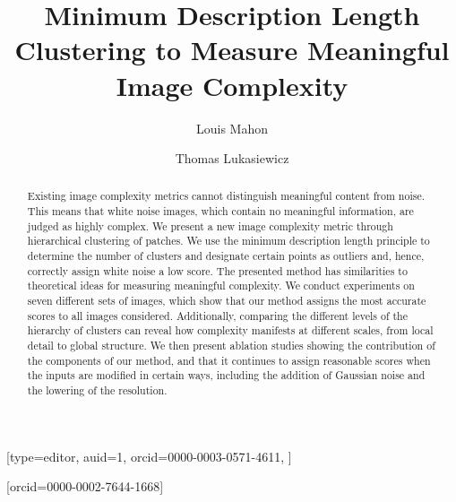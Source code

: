 \documentclass[a4paper,fleqn]{cas-sc}
\title{Minimum Description Length Clustering to Measure Meaningful Image Complexity}
\theoremstyle{remark}
\begin{document}


%
\author[1,3]{Louis Mahon}[type=editor,
       auid=1,
       orcid=0000-0003-0571-4611,
       ]





\author[2,3]{Thomas Lukasiewicz}[orcid=0000-0002-7644-1668]


\maketitle


\doublespacing


\begin{abstract}
       Existing image complexity metrics cannot distinguish meaningful content from noise. This means that white noise images, which contain no meaningful information, are judged as highly complex. We present a new image complexity metric through hierarchical clustering of patches. We use the minimum description length principle to determine the number of clusters and designate certain points as outliers and, hence, correctly assign white noise a low score. The presented method has similarities to theoretical ideas for measuring meaningful complexity. We conduct experiments on seven different sets of images, which show that our method assigns the most accurate scores to all images considered. Additionally, comparing the different levels of the hierarchy of clusters can reveal how complexity manifests at different scales, from local detail to global structure. We then present ablation studies showing the contribution of the components of our method, and that it continues to assign reasonable scores when the inputs are modified in certain ways, including the addition of Gaussian noise and the lowering of the resolution.

\end{abstract}
\end{document}
